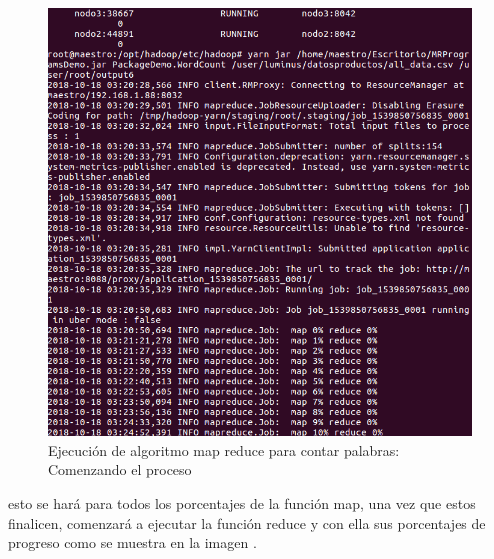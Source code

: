 \begin{figure}[!htbp]
	\hypertarget{fig:redi4}{\hspace{1pt}}
	\begin{center}
		\includegraphics[width=.9\textwidth]{capitulo4/images/ejemplo2.png}
		\caption{Ejecución de algoritmo map reduce para contar palabras: Comenzando el proceso}
		\label{fig:redi4}
	\end{center}
\end{figure}
esto se hará para todos los porcentajes de la función map, una vez que estos finalicen, comenzará a ejecutar
la función reduce y con ella sus porcentajes de progreso como se muestra en la imagen .
